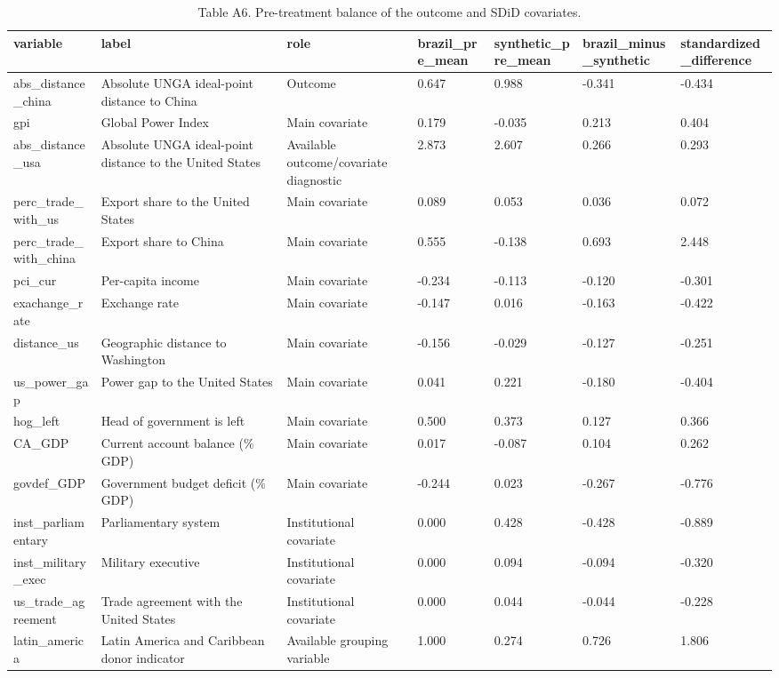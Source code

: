 \begin{table}

\caption{\label{tab:tab:sdid-balance}Table A6. Pre-treatment balance of the outcome and SDiD covariates.}
\centering
\begin{tabular}[t]{lllllll}
\toprule
variable & label & role & brazil\_pre\_mean & synthetic\_pre\_mean & brazil\_minus\_synthetic & standardized\_difference\\
\midrule
abs\_distance\_china & Absolute UNGA ideal-point distance to China & Outcome & 0.647 & 0.988 & -0.341 & -0.434\\
gpi & Global Power Index & Main covariate & 0.179 & -0.035 & 0.213 & 0.404\\
abs\_distance\_usa & Absolute UNGA ideal-point distance to the United States & Available outcome/covariate diagnostic & 2.873 & 2.607 & 0.266 & 0.293\\
perc\_trade\_with\_us & Export share to the United States & Main covariate & 0.089 & 0.053 & 0.036 & 0.072\\
perc\_trade\_with\_china & Export share to China & Main covariate & 0.555 & -0.138 & 0.693 & 2.448\\
\addlinespace
pci\_cur & Per-capita income & Main covariate & -0.234 & -0.113 & -0.120 & -0.301\\
exachange\_rate & Exchange rate & Main covariate & -0.147 & 0.016 & -0.163 & -0.422\\
distance\_us & Geographic distance to Washington & Main covariate & -0.156 & -0.029 & -0.127 & -0.251\\
us\_power\_gap & Power gap to the United States & Main covariate & 0.041 & 0.221 & -0.180 & -0.404\\
hog\_left & Head of government is left & Main covariate & 0.500 & 0.373 & 0.127 & 0.366\\
\addlinespace
CA\_GDP & Current account balance (\% GDP) & Main covariate & 0.017 & -0.087 & 0.104 & 0.262\\
govdef\_GDP & Government budget deficit (\% GDP) & Main covariate & -0.244 & 0.023 & -0.267 & -0.776\\
inst\_parliamentary & Parliamentary system & Institutional covariate & 0.000 & 0.428 & -0.428 & -0.889\\
inst\_military\_exec & Military executive & Institutional covariate & 0.000 & 0.094 & -0.094 & -0.320\\
us\_trade\_agreement & Trade agreement with the United States & Institutional covariate & 0.000 & 0.044 & -0.044 & -0.228\\
\addlinespace
latin\_america & Latin America and Caribbean donor indicator & Available grouping variable & 1.000 & 0.274 & 0.726 & 1.806\\
\bottomrule
\end{tabular}
\end{table}
